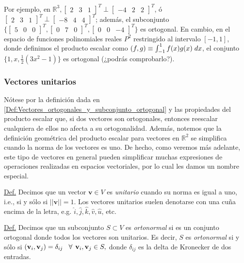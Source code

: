 \documentclass[12pt]{article}
\begin{document}
Por ejemplo, en $\mathbb{R}^3, \begin{bmatrix} 2 & 3 & 1 \end{bmatrix}^T\perp\begin{bmatrix} -4 & 2 & 2 \end{bmatrix}^T$, ó $\begin{bmatrix} 2 & 3 & 1 \end{bmatrix}^T\perp\begin{bmatrix} -8 & 4 & 4 \end{bmatrix}^T$; además, el subconjunto $\{\begin{bmatrix} 5  & 0 & 0 \end{bmatrix}^T, \begin{bmatrix} 0 & 7 & 0 \end{bmatrix}^T, \begin{bmatrix} 0 & 0 & -4 \end{bmatrix}^T\}$ es ortogonal. En cambio, en el espacio de funciones polinomiales reales $P^2$ restringido al intervalo $[-1,1]$, donde definimos el producto escalar como $(f,g)\equiv \int_{-1}^{1}f(x)g(x)\hspace{1mm} dx$, el conjunto $\{1,x,\frac{1}{2}(3x^2-1)\}$ es ortogonal (¿podrás comprobarlo?).

\subsubsection{Vectores unitarios}

Nótese por la definición dada en \ref{Def:Vectores_ortogonales_y_subconjunto_ortogonal} y las propiedades del producto escalar que, si dos vectores son ortogonales, entonces reescalar cualquiera de ellos no afecta a su ortogonalidad. Además, notemos que la definición geométrica del producto escalar para vectores en $\mathbb{R}^2$ se simplifica cuando la norma de los vectores es uno. De hecho, como veremos más adelante, este tipo de vectores en general pueden simplificar muchas expresiones de operaciones realizadas en espacios vectoriales, por lo cual les damos un nombre especial.

\vspace{2mm}

\begin{tcolorbox} \label{Def:Vector_unitario_y_subconjunto_ortonormal} 
    \underline{Def.} Decimos que un vector $\mathbf{v}\in V$ es \emph{unitario} cuando su norma es igual a uno, i.e., si y sólo si $||\mathbf{v}||=1.$ Los vectores unitarios suelen denotarse con una cuña encima de la letra, e.g. $\hat{i}, \hat{j}, \hat{k}, \hat{v}, \hat{u}$, etc.
    
    \vspace{3mm}
    
    \underline{Def.} Decimos que un subconjunto $S\subset V$ es \emph{ortonormal} si es un conjunto ortogonal donde todos los vectores son unitarios. Es decir, $S$ es \emph{ortonormal} si y sólo si $(\mathbf{v}_i,\mathbf{v}_j)=\delta_{ij}\hspace{3mm} \forall\hspace{1.5mm} \mathbf{v}_i,\mathbf{v}_j\in S,$ donde $\delta_{ij}$ es la delta de Kronecker de dos entradas.
\end{tcolorbox}
\end{document}
